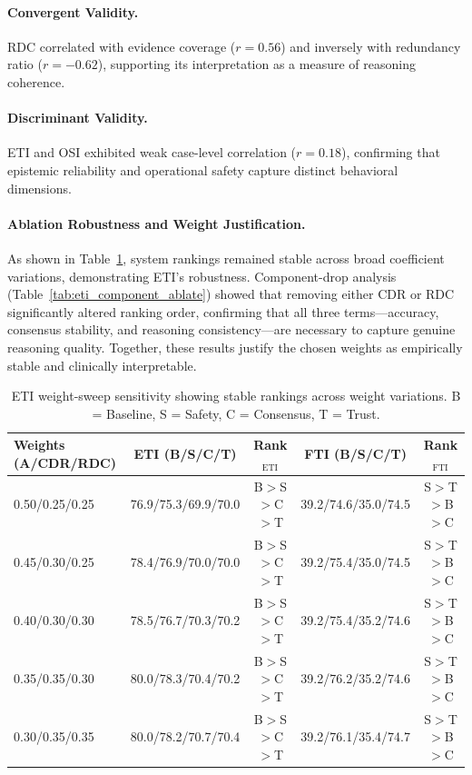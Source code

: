 \documentclass[letterpaper]{article} %
\begin{document}
\paragraph{Convergent Validity.}
RDC correlated with evidence coverage ($r{=}0.56$) and inversely with redundancy ratio ($r{=}-0.62$), supporting its interpretation as a measure of reasoning coherence.

\paragraph{Discriminant Validity.}
ETI and OSI exhibited weak case-level correlation ($r{=}0.18$), confirming that epistemic reliability and operational safety capture distinct behavioral dimensions.

\paragraph{Ablation Robustness and Weight Justification.}
As shown in Table~\ref{tab:eti_weight_sweep}, system rankings remained stable across broad coefficient variations, demonstrating ETI’s robustness. 
Component-drop analysis (Table~\ref{tab:eti_component_ablate}) showed that removing either CDR or RDC significantly altered ranking order, confirming that all three terms—accuracy, consensus stability, and reasoning consistency—are necessary to capture genuine reasoning quality. 
Together, these results justify the chosen weights as empirically stable and clinically interpretable.


\begin{table}[t]
\centering
\caption{ETI weight-sweep sensitivity showing stable rankings across weight variations. 
B = Baseline, S = Safety, C = Consensus, T = Trust.}
\label{tab:eti_weight_sweep}
\begin{tabular}{lcccc}
\toprule
\textbf{Weights (A/CDR/RDC)} & \textbf{ETI (B/S/C/T)} & \textbf{Rank$_\text{ETI}$} & \textbf{FTI (B/S/C/T)} & \textbf{Rank$_\text{FTI}$} \\
\midrule
0.50/0.25/0.25 & 76.9/75.3/69.9/70.0 & B$>$S$>$C$>$T & 39.2/74.6/35.0/74.5 & S$>$T$>$B$>$C \\
0.45/0.30/0.25 & 78.4/76.9/70.0/70.0 & B$>$S$>$C$>$T & 39.2/75.4/35.0/74.5 & S$>$T$>$B$>$C \\
0.40/0.30/0.30 & 78.5/76.7/70.3/70.2 & B$>$S$>$C$>$T & 39.2/75.4/35.2/74.6 & S$>$T$>$B$>$C \\
0.35/0.35/0.30 & 80.0/78.3/70.4/70.2 & B$>$S$>$C$>$T & 39.2/76.2/35.2/74.6 & S$>$T$>$B$>$C \\
0.30/0.35/0.35 & 80.0/78.2/70.7/70.4 & B$>$S$>$C$>$T & 39.2/76.1/35.4/74.7 & S$>$T$>$B$>$C \\
\bottomrule
\end{tabular}
\end{table}
\end{document}
